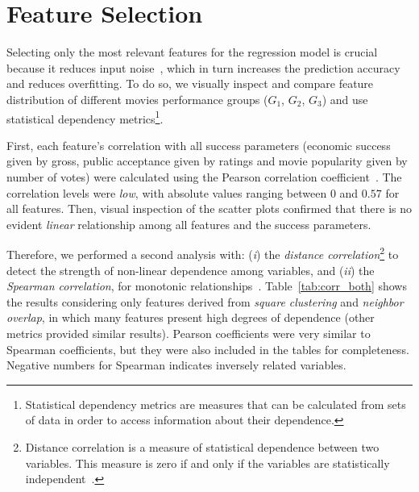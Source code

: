\section{Feature Selection}
\label{sec:featureselection}
Selecting only the most relevant features for the regression model is crucial
because it reduces input noise~\citep{mohri2012foundations}, which in turn
increases the prediction accuracy and reduces overfitting. To do so, we
visually inspect and compare feature distribution of different movies
performance groups ($G_1$, $G_2$, $G_3$) and use statistical dependency
metrics\footnote{Statistical dependency metrics are measures that can be
 calculated from sets of data in order to access information about their
 dependence.}.

First, each feature's correlation with all success parameters (economic success
given by gross, public acceptance given by ratings and movie popularity given
by number of votes) were calculated using the Pearson correlation
coefficient~\citep{pearson}. The correlation levels were \textit{low}, with
absolute values ranging between $0$ and $0.57$ for all features. Then, visual
inspection of the scatter plots confirmed that there is no evident
\textit{linear} relationship among all features and the success parameters.

Therefore, we performed a second analysis with: (\textit{i}) the
\textit{distance correlation}\footnote{Distance correlation is a measure of
statistical dependence between two variables. This measure is zero if and only
if the variables are statistically independent~\citep{szekely2007measuring}.}
to detect the strength of non-linear dependence among variables, and
(\textit{ii}) the \textit{Spearman correlation}, for monotonic
relationships~\citep{spearman1904proof}. Table~\ref{tab:corr_both} shows the
results considering only features derived from \textit{square clustering} and
\textit{neighbor overlap}, in which many features present high degrees of
dependence (other metrics provided similar results). Pearson coefficients were
very similar to Spearman coefficients, but they were also included in the
tables for completeness. Negative numbers for Spearman indicates inversely
related variables.




